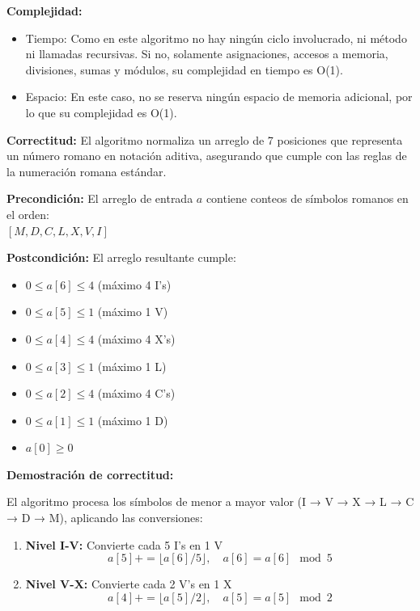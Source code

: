 \documentclass[12pt]{article}
\begin{document}
\begin{itemize}
\begin{algorithm}[H]
{        
    }
    \end{algorithm}

        \textbf{Complejidad:}
        \begin{itemize}
            \item Tiempo: Como en este algoritmo no hay ningún ciclo involucrado, ni método ni llamadas recursivas. Si no, solamente asignaciones, accesos a memoria, divisiones, sumas y módulos, su complejidad en tiempo es O(1).
            \item Espacio: En este caso, no se reserva ningún espacio de memoria adicional, por lo que su complejidad es O(1).
        \end{itemize}
        \textbf{Correctitud:}
        El algoritmo normaliza un arreglo de 7 posiciones que representa un número romano en notación aditiva, asegurando que cumple con las reglas de la numeración romana estándar.

\textbf{Precondición:} El arreglo de entrada $a$ contiene conteos de símbolos romanos en el orden: \\
$[M, D, C, L, X, V, I]$

\textbf{Postcondición:} El arreglo resultante cumple:
\begin{itemize}
    \item $0 \leq a[6] \leq 4$ (máximo 4 I's)
    \item $0 \leq a[5] \leq 1$ (máximo 1 V)
    \item $0 \leq a[4] \leq 4$ (máximo 4 X's)
    \item $0 \leq a[3] \leq 1$ (máximo 1 L)
    \item $0 \leq a[2] \leq 4$ (máximo 4 C's)
    \item $0 \leq a[1] \leq 1$ (máximo 1 D)
    \item $a[0] \geq 0$
\end{itemize}

\textbf{Demostración de correctitud:}

    El algoritmo procesa los símbolos de menor a mayor valor (I → V → X → L → C → D → M), aplicando las conversiones:

    \begin{enumerate}
        \item \textbf{Nivel I-V:} Convierte cada 5 I's en 1 V
            \[
            a[5] += \lfloor a[6] / 5 \rfloor, \quad a[6] = a[6] \mod 5
            \]

        \item \textbf{Nivel V-X:} Convierte cada 2 V's en 1 X
            \[
            a[4] += \lfloor a[5] / 2 \rfloor, \quad a[5] = a[5] \mod 2
            \]


\end{enumerate}
\end{itemize}
\end{document}
